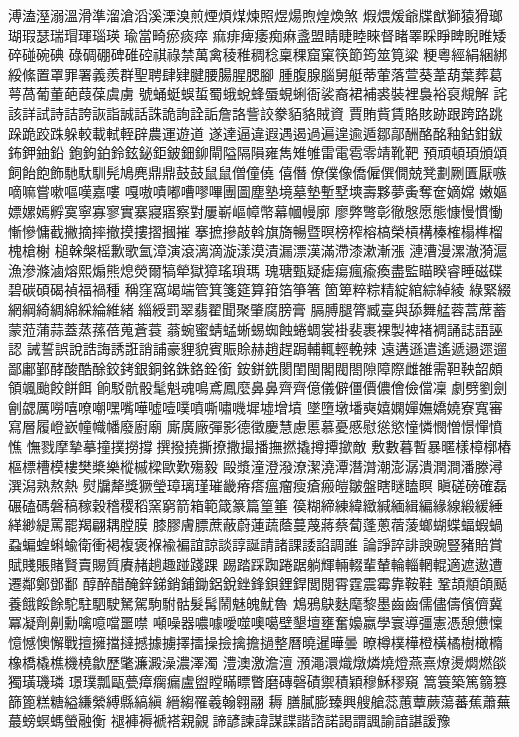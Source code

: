 溥溘溼溺溫滑準溜滄滔溪溧溴煎煙煩煤煉照煜煬煦煌煥煞
煆煨煖爺牒猷獅猿猾瑯瑚瑕瑟瑞瑁琿瑙瑛瑜當畸瘀痰瘁
痲痱痺痿痴痳盞盟睛睫睦睞督睹睪睬睜睥睨睢矮碎碰碗碘
碌碉硼碑碓硿祺祿禁萬禽稜稚稠稔稟稞窟窠筷節筠筮筧粱
粳粵經絹綑綁綏絛置罩罪署義羨群聖聘肆肄腱腰腸腥腮腳
腫腹腺腦舅艇蒂葷落萱葵葦葫葉葬葛萼萵葡董葩葭葆虞虜
號蛹蜓蜈蜇蜀蛾蛻蜂蜃蜆蜊衙裟裔裙補裘裝裡裊裕裒覜解
詫該詳試詩詰誇詼詣誠話誅詭詢詮詬詹詻訾詨豢貊貉賊資
賈賄貲賃賂賅跡跟跨路跳跺跪跤跦躲較載軾輊辟農運遊道
遂達逼違遐遇遏過遍遑逾遁鄒鄗酬酪酩釉鈷鉗鈸鈽鉀鈾鉛
鉋鉤鉑鈴鉉鉍鉅鈹鈿鉚閘隘隔隕雍雋雉雊雷電雹零靖靴靶
預頑頓頊頒頌飼飴飽飾馳馱馴髡鳩麂鼎⿍鼓⿎鼠⿏僧僮僥
僖僭僚僕像僑僱僎僩兢凳劃劂匱厭嗾嘀嘛嘗嗽嘔嘆嘉嘍
嘎嗷嘖嘟嘈嘐嗶團圖塵塾境墓墊塹墅塽壽夥夢夤奪奩嫡嫦
嫩嫗嫖嫘嫣孵寞寧寡寥實寨寢寤察對屢嶄嶇幛幣幕幗幔廓
廖弊彆彰徹慇愿態慷慢慣慟慚慘慵截撇摘摔撤摸摟摺摑摧
搴摭摻敲斡旗旖暢暨暝榜榨榕槁榮槓構榛榷榻榫榴槐槍榭
槌榦槃榣歉歌氳漳演滾漓滴漩漾漠漬漏漂漢滿滯漆漱漸漲
漣漕漫漯澈漪滬漁滲滌滷熔熙煽熊熄熒爾犒犖獄獐瑤瑣瑪
瑰瑭甄疑瘧瘍瘋瘉瘓盡監瞄睽睿睡磁碟碧碳碩碣禎福禍種
稱窪窩竭端管箕箋筵算箝箔箏箸箇箄粹粽精綻綰綜綽綾
綠緊綴網綱綺綢綿綵綸維緒緇綬罰翠翡翟聞聚肇腐膀膏
膈膊腿膂臧臺與舔舞艋蓉蒿蓆蓄蒙蒞蒲蒜蓋蒸蓀蓓蒐蒼蓑
蓊蜿蜜蜻蜢蜥蜴蜘蝕蜷蜩裳褂裴裹裸製裨褚裯誦誌語誣認
誡誓誤說誥誨誘誑誚誧豪貍貌賓賑賒赫趙趕跼輔輒輕輓辣
遠遘遜遣遙遞遢遝遛鄙鄘鄞酵酸酷酴鉸銬銀銅銘銖鉻銓銜
銨鉼銑閡閨閩閣閥閤隙障際雌雒需靼鞅韶頗領颯颱餃餅餌
餉駁骯骰髦魁魂鳴鳶鳳麼鼻⿐齊⿑億儀僻僵價儂儈儉儅凜
劇劈劉劍劊勰厲嘮嘻嘹嘲嘿嘴嘩噓噎噗噴嘶嘯嘰墀墟增墳
墜墮墩墦奭嬉嫻嬋嫵嬌嬈寮寬審寫層履嶝嶔幢幟幡廢廚廟
廝廣廠彈影德徵慶慧慮慝慕憂慼慰慫慾憧憐憫憎憬憚憤憔
憮戮摩摯摹撞撲撈撐撰撥撓撕撩撒撮播撫撚撬撙撢撳敵
敷數暮暫暴暱樣樟槨樁樞標槽模樓樊槳樂樅槭樑歐歎殤毅
毆漿潼澄潑潦潔澆潭潛潸潮澎潺潰潤澗潘滕潯潠潟熟熬熱
熨牖犛獎獗瑩璋璃瑾璀畿瘠瘩瘟瘤瘦瘡瘢皚皺盤瞎瞇瞌瞑
瞋磋磅確磊碾磕碼磐稿稼穀稽稷稻窯窮箭箱範箴篆篇篁箠
篌糊締練緯緻緘緬緝編緣線緞緩綞緙緲緹罵罷羯翩耦膛膜
膝膠膚膘蔗蔽蔚蓮蔬蔭蔓蔑蔣蔡蔔蓬蔥蓿蔆螂蝴蝶蝠蝦蝸
蝨蝙蝗蝌蝓衛衝褐複褒褓褕褊誼諒談諄誕請諸課諉諂調誰
論諍誶誹諛豌豎豬賠賞賦賤賬賭賢賣賜質賡赭趟趣踫踐踝
踢踏踩踟踡踞躺輝輛輟輩輦輪輜輞輥適遮遨遭遷鄰鄭鄧鄱
醇醉醋醃鋅銻銷鋪鋤鋁銳銼鋒鋇鋰銲閭閱霄霆震霉靠鞍鞋
鞏頡頫頜颳養餓餒餘駝駐駟駛駑駕駒駙骷髮髯鬧魅魄魷魯
鴆鴉鴃麩麾黎墨⿒齒儒儘儔儐儕冀冪凝劑劓勳噙噫噹噩噤
噸噪器噥噱噯噬噢噶壁墾壇壅奮嬝嬴學寰導彊憲憑憩憊懍
憶憾懊懈戰擅擁擋撻撼據擄擇擂操撿擒擔撾整曆曉暹曄曇
暸樽樸樺橙橫橘樹橄橢橡橋橇樵機橈歙歷氅濂澱澡濃澤濁
澧澳激澹澶澦澠澴熾燉燐燒燈燕熹燎燙燜燃燄獨璜璣璘
璟璞瓢甌甍瘴瘸瘺盧盥瞠瞞瞟瞥磨磚磬磧禦積穎穆穌穋窺
篙簑築篤篛篡篩篦糕糖縊縑縈縛縣縞縝縉縐罹羲翰翱翮
耨膳膩膨臻興艘艙蕊蕙蕈蕨蕩蕃蕉蕭蕪蕞螃螟螞螢融衡
褪褲褥褫褡親覦諦諺諫諱謀諜諧諮諾謁謂諷諭諳諶諼豫
